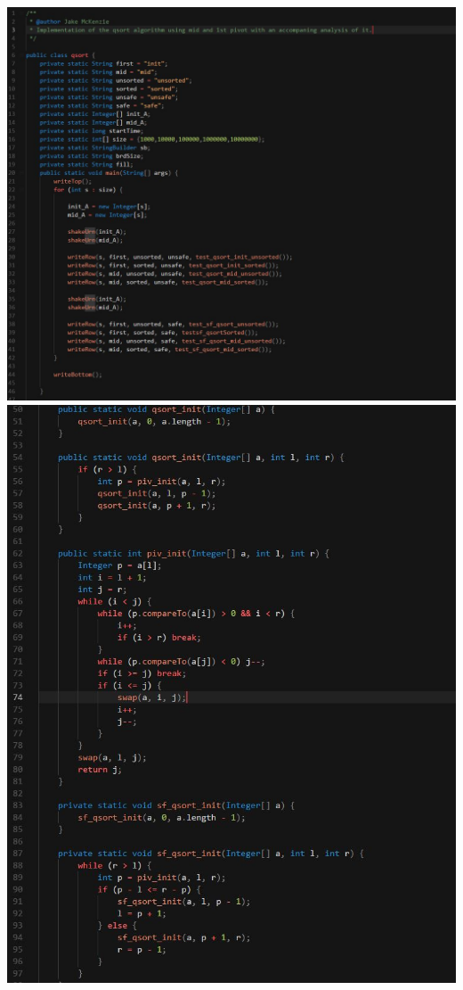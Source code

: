 \documentclass[paper=a4,fontsize=11pt]{article}
\begin{document}
\includegraphics[width=\linewidth]{code1.jpg}
\newpage
\includegraphics[width=\linewidth]{code2.jpg}
\end{document}
